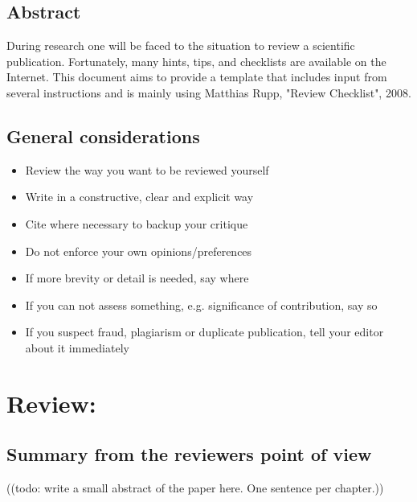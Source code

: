

\section*{Abstract}
During research one will be faced to the situation to review a scientific publication.
Fortunately, many hints, tips, and checklists are available on the Internet.
This document aims to provide a template that includes input from several instructions and is mainly using Matthias Rupp, "Review Checklist", 2008.

\section*{General considerations}
\begin{itemize}[resume]
    \item Review the way you want to be reviewed yourself
    \item Write in a constructive, clear and explicit way
    \item Cite where necessary to backup your critique
    \item Do not enforce your own opinions/preferences
    \item If more brevity or detail is needed, say where
    \item If you can not assess something, e.g. significance of contribution, say so
    \item If you suspect fraud, plagiarism or duplicate publication, tell your editor about it immediately
\end{itemize}

\chapter*{Review: \textcolor{HighlightColor}{\metaTitle}}\label{sec:review}\vspace{.5cm}
\setcounter{chapter}{1}

\section*{Summary from the reviewers point of view}\label{sec:summary}
\noindent
\textcolor{HighlightColor}{((todo: write a small abstract of the paper here. One sentence per chapter.))}

